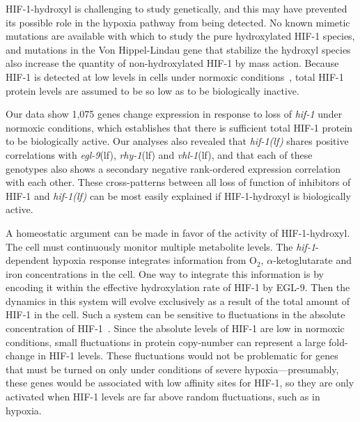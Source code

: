 \documentclass[9pt,twocolumn,twoside,lineno]{pnas-new}
\newcommand{\gene}[1]{\mbox{\emph{#1}}}
\newcommand{\egl}{\gene{egl-9}(lf)}
\newcommand{\rhy}{\gene{rhy-1}(lf)}
\newcommand{\vhl}{\gene{vhl-1}(lf)}
\newcommand{\hif}{\gene{hif-1(lf)}}
\newcommand{\eglp}{EGL-9}
\newcommand{\hifp}{HIF-1}
\newcommand{\hifn}{1,075}
\begin{document}
\hifp{}-hydroxyl is challenging to study genetically, and this may have
prevented its possible role in the hypoxia pathway from being detected. No known
mimetic mutations are available with which to study the pure hydroxylated
\hifp{} species, and mutations in the Von Hippel-Lindau gene that stabilize the
hydroxyl species also increase the quantity of non-hydroxylated \hifp{} by mass
action. Because \hifp{} is detected at low levels in cells under normoxic
conditions~\cite{Wang1993}, total \hifp{} protein levels are assumed to be so
low as to be biologically inactive.

Our data show \hifn{} genes change expression in response to loss of
\gene{hif-1} under normoxic conditions, which establishes that there is
sufficient total \hifp{} protein to be biologically active. Our analyses also
revealed that \hif{} shares positive correlations with \egl{}, \rhy{} and
\vhl{}, and that each of these genotypes also shows a secondary negative
rank-ordered expression correlation with each other. These cross-patterns
between all loss of function of inhibitors of \hifp{} and \hif{} can be most
easily explained if \hifp{}-hydroxyl is biologically active.

A homeostatic argument can be made in favor of the activity of \hifp{}-hydroxyl.
The cell must continuously monitor multiple metabolite levels. The
\gene{hif-1}-dependent hypoxia response integrates information from O$_2$,
$\alpha$-ketoglutarate and iron concentrations in the cell. One
way to integrate this information is by encoding it within the effective
hydroxylation rate of \hifp{} by \eglp{}. Then the dynamics in this system will
evolve exclusively as a result of the total amount of \hifp{} in the cell. Such
a system can be sensitive to fluctuations in the absolute concentration of
\hifp{}~\cite{Goentoro2009a}. Since the absolute levels of \hifp{} are low in
normoxic conditions, small fluctuations in protein copy-number can represent a
large fold-change in \hifp{} levels. These fluctuations would not be problematic
for genes that must be turned on only under conditions of severe
hypoxia---presumably, these genes would be associated with low affinity sites
for \hifp{}, so they are only activated when \hifp{} levels are far above
random fluctuations, such as in hypoxia.
\end{document}
